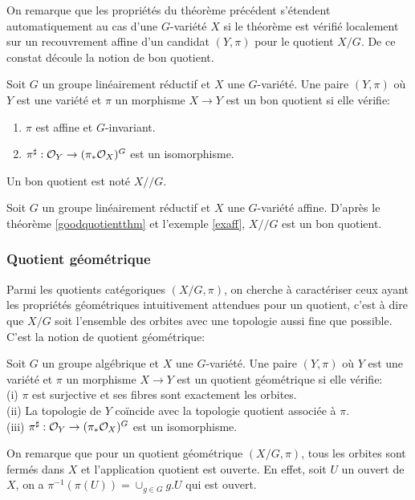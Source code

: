 On remarque que les propriétés du théorème précédent s'étendent automatiquement au cas d'une $G$-variété $X$ si le théorème est vérifié localement sur un recouvrement affine d'un candidat $(Y,\pi)$ pour le quotient $X/G$. De ce constat découle la notion de bon quotient.

\begin{defn}
Soit $G$ un groupe linéairement réductif et $X$ une $G$-variété. Une paire $(Y, \pi)$ où $Y$ est une variété et $\pi$ un morphisme $X\rightarrow Y$ est un bon quotient si elle vérifie:
\begin{enumerate}
\item $\pi$ est affine et $G$-invariant.
\item $\pi^\sharp:\mathcal{O}_Y \rightarrow (\pi_*\mathcal{O}_X)^G$ est un isomorphisme.
\end{enumerate}
Un bon quotient est noté $X//G$.
\end{defn}

\begin{ex}
Soit $G$ un groupe linéairement réductif et $X$ une $G$-variété affine. D'après le théorème \ref{goodquotientthm} et l'exemple \ref{exaff}, $X//G$ est un bon quotient.
\end{ex}


\subsubsection{Quotient géométrique}

Parmi les quotients catégoriques $(X/G,\pi)$, on cherche à caractériser ceux ayant les propriétés géométriques intuitivement attendues pour un quotient, c'est à dire que $X/G$ soit l'ensemble des orbites avec une topologie aussi fine que possible. C'est la notion de quotient géométrique:

\begin{defn}
Soit $G$ un groupe algébrique et $X$ une $G$-variété. Une paire $(Y, \pi)$ où $Y$ est une variété et $\pi$ un morphisme $X\rightarrow Y$ est un quotient géométrique si elle vérifie:\\
(i) $\pi$ est surjective et ses fibres sont exactement les orbites.\\
(ii) La topologie de $Y$ coïncide avec la topologie quotient associée à $\pi$.\\
(iii) $\pi^\sharp:\mathcal{O}_Y \rightarrow (\pi_*\mathcal{O}_X)^G$ est un isomorphisme.
\end{defn}

On remarque que pour un quotient géométrique $(X/G, \pi)$, tous les orbites sont fermés dans $X$ et l'application quotient est ouverte. En effet, soit $U$ un ouvert de $X$, on a $\pi^{-1}(\pi(U))=\cup_{g\in G}g.U$ qui est ouvert.

